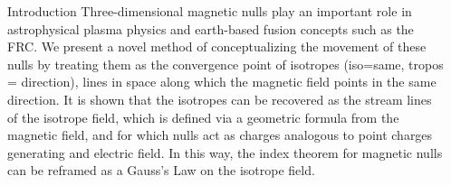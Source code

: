 \documentclass[final]{beamer}
\newlength{\sepwid}
\newlength{\onecolwid}
\begin{document}
\begin{frame}[t]
\begin{columns}[t]

\begin{column}{\sepwid}\end{column} %

\begin{column}{\onecolwid} %

\begin{block}{\huge{Introduction}}
	Three-dimensional magnetic nulls play an important role in astrophysical
	plasma physics and earth-based fusion concepts such as the FRC. 
	We present a novel method of conceptualizing the movement of these nulls by treating
        them as the convergence point of isotropes (iso=same, tropos = direction), lines in space
	along which the magnetic field points in the same direction. 
	It is shown that the isotropes can be recovered as the stream lines of
	the isotrope field, which is defined via a geometric formula from the
	magnetic field, and for which nulls act as charges analogous to point charges generating
        and electric field. In this way, the index theorem for magnetic nulls can be reframed as a Gauss's Law
        on the isotrope field. 
	
\end{block}


\end{column}
\end{columns}
\end{frame}
\end{document}
